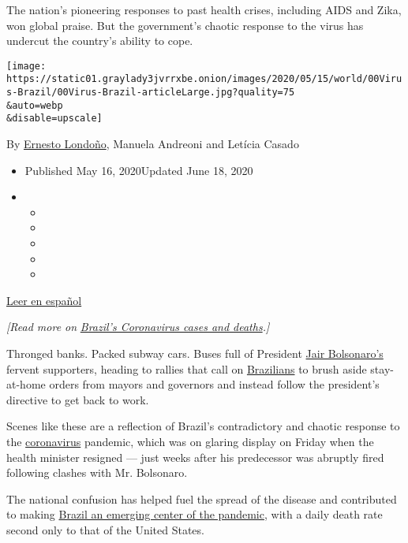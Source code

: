 The nation's pioneering responses to past health crises, including AIDS
and Zika, won global praise. But the government's chaotic response to
the virus has undercut the country's ability to cope.

\texttt{[image: https://static01.graylady3jvrrxbe.onion/images/2020/05/15/world/00Virus-Brazil/00Virus-Brazil-articleLarge.jpg?quality=75\\\&auto=webp\\\&disable=upscale]}

By \href{https://www.nytimes3xbfgragh.onion/by/ernesto-londono}{Ernesto
Londoño}, Manuela Andreoni and Letícia Casado

\begin{itemize}
\item
  Published May 16, 2020Updated June 18, 2020
\item
  \begin{itemize}
  \item
  \item
  \item
  \item
  \item
  \end{itemize}
\end{itemize}

\href{https://www.nytimes3xbfgragh.onion/es/2020/05/18/espanol/america-latina/covid-brasil.html}{Leer
en español}

\emph{{[}Read more on}
\href{https://www.nytimes3xbfgragh.onion/article/brazil-coronavirus-cases.html}{\emph{Brazil's
Coronavirus cases and deaths}}\emph{.{]}}

Thronged banks. Packed subway cars. Buses full of President
\href{https://www.nytimes3xbfgragh.onion/2020/06/10/world/americas/bolsonaro-coup-coronavirus-brazil.html}{Jair
Bolsonaro's} fervent supporters, heading to rallies that call on
\href{https://www.nytimes3xbfgragh.onion/2020/06/10/world/americas/bolsonaro-coup-coronavirus-brazil.html}{Brazilians}
to brush aside stay-at-home orders from mayors and governors and instead
follow the president's directive to get back to work.

Scenes like these are a reflection of Brazil's contradictory and chaotic
response to the
\href{https://www.nytimes3xbfgragh.onion/2020/06/10/world/americas/bolsonaro-coup-coronavirus-brazil.html}{coronavirus}
pandemic, which was on glaring display on Friday when the health
minister resigned --- just weeks after his predecessor was abruptly
fired following clashes with Mr. Bolsonaro.

The national confusion has helped fuel the spread of the disease and
contributed to making
\href{https://www.nytimes3xbfgragh.onion/2020/06/08/world/americas/brazil-coronavirus-statistics.html}{Brazil
an emerging center of the pandemic}, with a daily death rate second only
to that of the United States.

